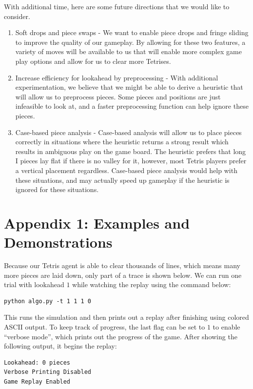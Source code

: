 \documentclass[11pt]{article}
\begin{document}
With additional time, here are some future directions that we would like to consider.
\begin{enumerate}
\item Soft drops and piece swaps - We want to enable piece drops and fringe sliding to improve the quality of our gameplay. By allowing for these two features, a variety of moves will be available to us that will enable more complex game play options and allow for us to clear more Tetrises.
\item Increase efficiency for lookahead by preprocessing - With additional experimentation, we believe that we might be able to derive a heuristic that will allow us to preprocess pieces. Some pieces and positions are just infeasible to look at, and a faster preprocessing function can help ignore these pieces.
\item Case-based piece analysis - Case-based analysis will allow us to place pieces correctly in situations where the heuristic returns a strong result which results in ambiguous play on the game board. The heuristic prefers that long I pieces lay flat if there is no valley for it, however, most Tetris players prefer a vertical placement regardless. Case-based piece analysis would help with these situations, and may actually speed up gameplay if the heuristic is ignored for these situations.
\end{enumerate}

\section{Appendix 1: Examples and Demonstrations}

Because our Tetris agent is able to clear thousands of lines, which means many more pieces are laid down, only part of a trace is shown below. We can run one trial with lookahead $1$ while watching the replay using the command below:

\begin{verbatim}
python algo.py -t 1 1 1 0
\end{verbatim}

This runs the simulation and then prints out a replay after finishing using colored ASCII output. To keep track of progress, the last flag can be set to $1$ to enable ``verbose mode'', which prints out the progress of the game. After showing the following output, it begins the replay:

\begin{verbatim}
Lookahead: 0 pieces
Verbose Printing Disabled
Game Replay Enabled
\end{verbatim}
\end{document}
